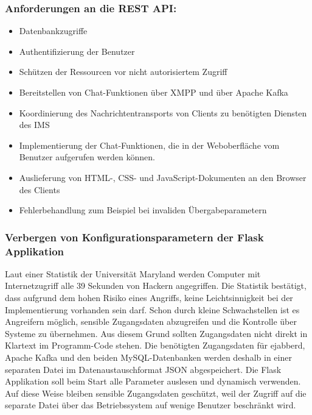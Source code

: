 \documentclass[a4paper,titlepage,halfparskip,12pt]{scrreprt}
\begin{document}
\begin{onehalfspacing}
\subsubsection*{Anforderungen an die \acs{REST} \acs{API}:}

\begin{itemize}
\item Datenbankzugriffe
\item Authentifizierung der Benutzer
\item Schützen der Ressourcen vor nicht autorisiertem Zugriff
\item Bereitstellen von Chat-Funktionen über \ac{XMPP} und über Apache Kafka
\item Koordinierung des Nachrichtentransports von Clients zu benötigten Diensten des \ac{IMS}
\item Implementierung der Chat-Funktionen, die in der Weboberfläche vom Benutzer aufgerufen werden können.
\item Auslieferung von \ac{HTML}-, \ac{CSS}- und JavaScript-Dokumenten an den Browser des Clients
\item Fehlerbehandlung zum Beispiel bei invaliden Übergabeparametern
\end{itemize}


\subsubsection*{Verbergen von Konfigurationsparametern der Flask Applikation}

Laut einer Statistik der Universität Maryland \cite{securityStatisticWebSites} werden Computer mit Internetzugriff alle 39 Sekunden von Hackern angegriffen. Die Statistik bestätigt, dass aufgrund dem hohen Risiko eines Angriffs, keine Leichtsinnigkeit bei der Implementierung vorhanden sein darf. Schon durch kleine Schwachstellen ist es Angreifern möglich, sensible Zugangsdaten abzugreifen und die Kontrolle über Systeme zu übernehmen. Aus diesem Grund sollten Zugangsdaten nicht direkt in Klartext im Programm-Code stehen. Die benötigten Zugangsdaten für ejabberd, Apache Kafka und den beiden MySQL-Datenbanken werden deshalb in einer separaten Datei im Datenaustauschformat \acs{JSON} abgespeichert. Die Flask Applikation soll beim Start alle Parameter auslesen und dynamisch verwenden. Auf diese Weise bleiben sensible Zugangsdaten geschützt, weil der Zugriff auf die separate Datei über das Betriebssystem auf wenige Benutzer beschränkt wird.


\end{onehalfspacing}
\end{document}
